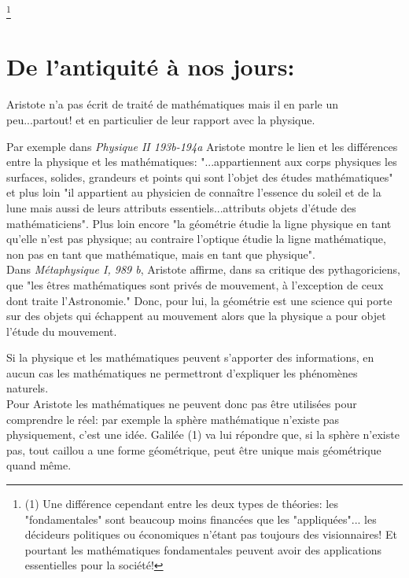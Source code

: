 \documentclass[a4paper, 12pt, twoside]{book}
\begin{document}
  \footnote{
 (1) Une différence cependant entre les deux types de théories: les "fondamentales" sont beaucoup moins financées que les "appliquées"... les décideurs politiques ou économiques n'étant pas toujours des visionnaires! Et pourtant les mathématiques fondamentales peuvent avoir des applications essentielles pour la société!}\
 

  
  
  
 \newpage \section{De l'antiquité à nos jours:}
 

 
 
 Aristote n'a pas écrit de traité de mathématiques mais il en parle un peu...partout! et en particulier de leur rapport avec la physique. \
 
 Par exemple dans \textit{Physique II 193b-194a} Aristote montre le lien et les différences entre la physique  et les mathématiques: "...appartiennent aux corps physiques les surfaces, solides, grandeurs et points qui sont l'objet des études mathématiques" et plus loin "il appartient au physicien de connaître l'essence du soleil et de la lune mais aussi de leurs attributs essentiels...attributs objets d'étude des mathématiciens". Plus loin encore "la géométrie étudie la ligne physique en tant qu'elle n'est pas physique; au contraire l'optique étudie la ligne mathématique, non pas en tant que mathématique, mais en tant que physique".\\
 

Dans \textit{Métaphysique I, 989 b}, Aristote affirme, dans sa critique des pythagoriciens, que "les êtres mathématiques sont privés de mouvement, à l'exception de ceux dont traite l'Astronomie." Donc, pour lui, la géométrie est une science qui porte sur des objets qui échappent au mouvement alors que la physique a pour objet l'étude du mouvement.\
 
 Si  la physique et les mathématiques peuvent s'apporter des informations, en aucun cas les mathématiques ne permettront d'expliquer les phénomènes naturels.\\
 


 
 
 
 Pour Aristote les mathématiques ne peuvent donc pas être utilisées pour comprendre le réel: par exemple la sphère mathématique n'existe pas physiquement, c'est une idée. Galilée (1) va lui répondre que, si la sphère n'existe pas, tout caillou a une forme géométrique, peut être unique mais géométrique quand même. \
 
\end{document}
